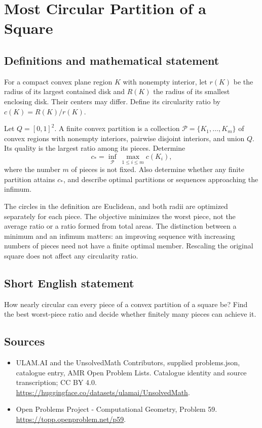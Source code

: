 \documentclass[11pt,a4paper]{article}
\begin{document}
\section*{Most Circular Partition of a Square}\label{statement}

\subsection{Definitions and mathematical statement}
For a compact convex plane region $K$ with nonempty interior, let
$r(K)$ be the radius of its largest contained disk and $R(K)$ the
radius of its smallest enclosing disk. Their centers may differ.
Define its circularity ratio by $c(K)=R(K)/r(K)$.

Let $Q=[0,1]^2$. A finite convex partition is a collection
$\mathcal P=\{K_1,\ldots,K_m\}$ of convex regions with nonempty
interiors, pairwise disjoint interiors, and union $Q$. Its quality
is the largest ratio among its pieces. Determine
\[
 c_* = \inf_{\mathcal P}\ \max_{1\le i\le m}c(K_i),
\]
where the number $m$ of pieces is not fixed. Also determine whether
any finite partition attains $c_*$, and describe optimal partitions
or sequences approaching the infimum.

The circles in the definition are Euclidean, and both radii are
optimized separately for each piece. The objective minimizes the
worst piece, not the average ratio or a ratio formed from total
areas. The distinction between a minimum and an infimum matters:
an improving sequence with increasing numbers of pieces need not
have a finite optimal member. Rescaling the original square does
not affect any circularity ratio.
\subsection{Short English statement}
How nearly circular can every piece of a convex partition of a
square be? Find the best worst-piece ratio and decide whether
finitely many pieces can achieve it.
\subsection{Sources}
\begin{itemize}
\item[S1] ULAM.AI and the UnsolvedMath Contributors, supplied problems.json, catalogue entry, AMR Open Problem Lists. Catalogue identity and source transcription; CC BY 4.0.
\url{https://huggingface.co/datasets/ulamai/UnsolvedMath}.
\item[S2] Open Problems Project - Computational Geometry, Problem 59. 
\url{https://topp.openproblem.net/p59}.
\end{itemize}
\end{document}
